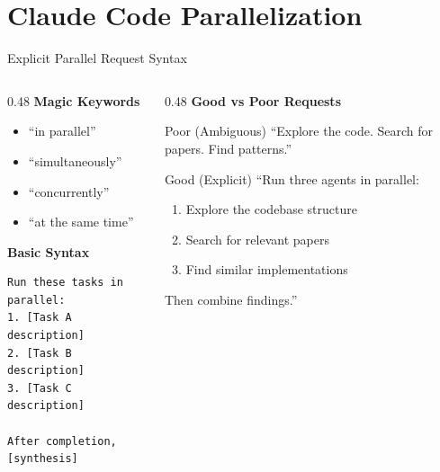 \documentclass[aspectratio=169,11pt]{beamer}
\begin{document}
\section{Claude Code Parallelization}

\begin{frame}[fragile]{Explicit Parallel Request Syntax}
    \begin{columns}[T]
        \begin{column}{0.48\textwidth}
            \textbf{Magic Keywords}
            \begin{itemize}
                \item ``in parallel''
                \item ``simultaneously''
                \item ``concurrently''
                \item ``at the same time''
            \end{itemize}

            \vspace{0.3cm}
            \textbf{Basic Syntax}
            \begin{lstlisting}[style=prompt]
Run these tasks in parallel:
1. [Task A description]
2. [Task B description]
3. [Task C description]

After completion, [synthesis]
            \end{lstlisting}
        \end{column}
        \begin{column}{0.48\textwidth}
            \textbf{Good vs Poor Requests}

            \begin{alertblock}{Poor (Ambiguous)}
                \footnotesize
                ``Explore the code. Search for papers. Find patterns.''
            \end{alertblock}

            \begin{exampleblock}{Good (Explicit)}
                \footnotesize
                ``Run three agents in parallel:
                \begin{enumerate}
                    \item Explore the codebase structure
                    \item Search for relevant papers
                    \item Find similar implementations
                \end{enumerate}
                Then combine findings.''
            \end{exampleblock}
        \end{column}
    \end{columns}
\end{frame}
\end{document}

